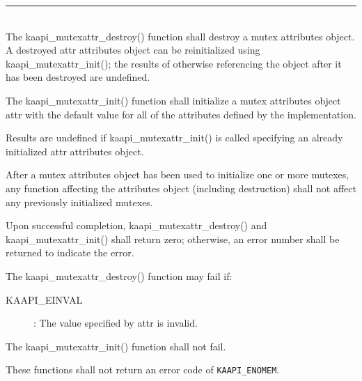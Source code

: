 \begin{description}
\vspace*{3ex} \hrule width 4cm
\item [\texttt{int kaapi\_mutexattr\_init (kaapi\_mutexattr\_t *attr)}]
\item [\texttt{int kaapi\_mutexattr\_destroy (kaapi\_mutexattr\_t *attr)}]~\\

The kaapi\_mutexattr\_destroy() function shall destroy a mutex attributes
object. A destroyed attr attributes object can be reinitialized using
kaapi\_mutexattr\_init(); the results of otherwise referencing the object
after it has been destroyed are undefined.

The kaapi\_mutexattr\_init() function shall initialize a mutex attributes
object attr with the default value for all of the attributes defined by the
implementation.

Results are undefined if kaapi\_mutexattr\_init() is called specifying an
already initialized attr attributes object.

After a mutex attributes object has been used to initialize one or more
mutexes, any function affecting the attributes object (including destruction)
shall not affect any previously initialized mutexes.

Upon successful completion, kaapi\_mutexattr\_destroy() and
kaapi\_mutexattr\_init() shall return zero; otherwise, an error number shall
be returned to indicate the error.

The kaapi\_mutexattr\_destroy() function may fail if:

\begin{description}
\item [KAAPI\_EINVAL]: The value specified by attr is invalid.
\end{description}

The kaapi\_mutexattr\_init() function shall not fail.

These functions shall not return an error code of \verb+KAAPI_ENOMEM+.
\end{description}


